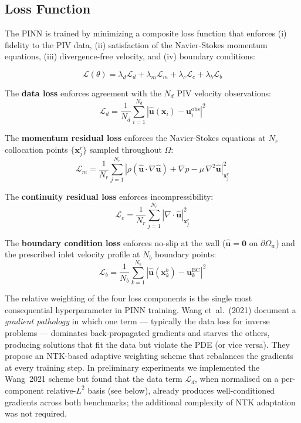 \documentclass[12pt,a4paper]{article}
\newcommand{\bu}{\bm{u}}          %
\newcommand{\bx}{\bm{x}}          %
\newcommand{\nablah}{\nabla}       %
\newcommand{\Loss}{\mathcal{L}}    %
\begin{document}
\subsection{Loss Function}
\label{sec:loss}

The PINN is trained by minimizing a composite loss function that
enforces (i) fidelity to the PIV data, (ii) satisfaction of the
Navier-Stokes momentum equations, (iii) divergence-free velocity,
and (iv) boundary conditions:

\begin{equation}
  \Loss(\theta) = \lambda_d \Loss_d
               + \lambda_m \Loss_m
               + \lambda_c \Loss_c
               + \lambda_b \Loss_b
  \label{eq:total_loss}
\end{equation}

The \textbf{data loss} enforces agreement with the $N_d$ PIV
velocity observations:
\begin{equation}
  \Loss_d = \frac{1}{N_d}\sum_{i=1}^{N_d}
            \left|\hat{\bu}(\bx_i) - \bu_i^{\text{obs}}\right|^2
  \label{eq:loss_data}
\end{equation}

The \textbf{momentum residual loss} enforces the Navier-Stokes
equations at $N_r$ collocation points $\{\bx_j^r\}$ sampled
throughout $\Omega$:
\begin{equation}
  \Loss_m = \frac{1}{N_r}\sum_{j=1}^{N_r}
            \left|\rho(\hat{\bu} \cdot \nablah\hat{\bu})
            + \nablah\hat{p} - \mu\,\nablah^2\hat{\bu}
            \right|^2_{\bx_j^r}
  \label{eq:loss_momentum}
\end{equation}

The \textbf{continuity residual loss} enforces incompressibility:
\begin{equation}
  \Loss_c = \frac{1}{N_r}\sum_{j=1}^{N_r}
            \left|\nablah \cdot \hat{\bu}\right|^2_{\bx_j^r}
  \label{eq:loss_continuity}
\end{equation}

The \textbf{boundary condition loss} enforces no-slip at the wall
($\hat{\bu} = \bm{0}$ on $\partial\Omega_w$) and the prescribed
inlet velocity profile at $N_b$ boundary points:
\begin{equation}
  \Loss_b = \frac{1}{N_b}\sum_{k=1}^{N_b}
            \left|\hat{\bu}(\bx_k^b) - \bu_k^{\text{BC}}\right|^2
  \label{eq:loss_bc}
\end{equation}

The relative weighting of the four loss components is the
single most consequential hyperparameter in PINN training. Wang
et~al.~(2021) \cite{Wang2021GradientPath} document a
\emph{gradient pathology} in which one term --- typically the
data loss for inverse problems --- dominates back-propagated
gradients and starves the others, producing solutions that fit
the data but violate the PDE (or vice versa). They propose an
NTK-based adaptive weighting scheme that rebalances the
gradients at every training step. In preliminary experiments we
implemented the Wang~2021 scheme but found that the data term
$\Loss_d$, when normalised on a per-component relative-$L^2$
basis (see below), already produces well-conditioned gradients
across both benchmarks; the additional complexity of NTK
adaptation was not required.
\end{document}
